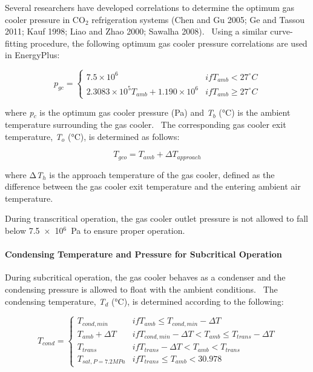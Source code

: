 Several researchers have developed correlations to determine the optimum gas cooler pressure in CO\(_{2}\) refrigeration systems (Chen and Gu 2005; Ge and Tassou 2011; Kauf 1998; Liao and Zhao 2000; Sawalha 2008).~ Using a similar curve-fitting procedure, the following optimum gas cooler pressure correlations are used in EnergyPlus:

\begin{equation}
  p_{gc} = \left\{
             \begin{array}{cl}
               7.5 \times 10^6                                & if T_{amb} <    27^{\circ}C \\
               2.3083 \times 10^5 T_{amb} + 1.190 \times 10^6 & if T_{amb} \geq 27^{\circ}C
             \end{array}
           \right.
\end{equation}

where \emph{p\(_{c}\)} is the optimum gas cooler pressure (Pa) and \emph{T\(_{b}\)} (°C) is the ambient temperature surrounding the gas cooler.~ The corresponding gas cooler exit temperature, \emph{T\(_{o}\)} (°C), is determined as follows:

\begin{equation}
{T_{gco}} = {T_{amb}} + \Delta {T_{approach}}
\end{equation}

where Δ\emph{T\(_{h}\)} is the approach temperature of the gas cooler, defined as the difference between the gas cooler exit temperature and the entering ambient air temperature.

During transcritical operation, the gas cooler outlet pressure is not allowed to fall below 7.5~×~10\(^{6}\)~Pa to ensure proper operation.

\paragraph{Condensing Temperature and Pressure for Subcritical Operation}\label{condensing-temperature-and-pressure-for-subcritical-operation}

During subcritical operation, the gas cooler behaves as a condenser and the condensing pressure is allowed to float with the ambient conditions.~ The condensing temperature, \emph{T\(_{d}\)} (°C), is determined according to the following:

\begin{equation}
  T_{cond} = \left\{
               \begin{array}{cl}
                 T_{cond,min}                           & if T_{amb} \le T_{cond,min} - \Delta T \\
                 T_{amb} + \Delta T                     & if T_{cond,min} - \Delta T < T_{amb} \le T_{trans} - \Delta T \\
                 T_{trans}                              & if T_{trans} - \Delta T < T_{amb} < T_{trans} \\
                 T_{sat,P = 7.2MPa}                     & if T_{trans} \le {T_{amb}} < 30.978 
               \end{array}
             \right.
\end{equation}

